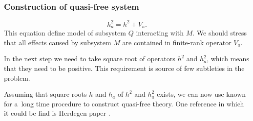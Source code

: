\documentclass[10pt,t]{beamer}
\begin{document}
\begin{frame}
  \frametitle{Construction of quasi-free system}


  \begin{equation}
    \label{eq:Epstein-Glaser-24-A}
    h_{ a }^{ 2 } = h^{ 2 } + V_{ a }.
  \end{equation}
  This equation define model of subsystem $Q$ interacting with $M$.
  We should stress that all effects caused by subsystem $M$ are contained
  in finite-rank operator $V_{ a }$.

  In the next step we need to take square root of operators $h^{ 2 }$
  and $h_{ a }^{ 2 }$, which means that they need to be positive. This
  requirement is source of few subtleties in the problem.

  Assuming that square roots $h$ and $h_{ a }$ of $h^{ 2 }$ and $h_{ a }^{ 2 }$
  exists, we can now use known for a~long time procedure to construct
  quasi-free theory. One reference in which it could be find is Herdegen
  paper \parencite{Herdegen-Quantum-backreaction-ETC-Part-I-Pub-2005}.

\end{frame}




















\end{document}
